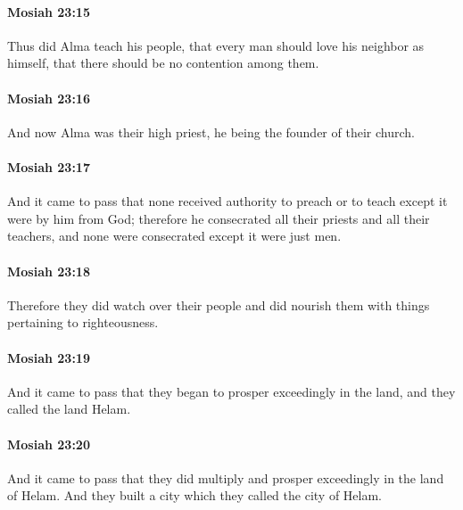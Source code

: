 		\paragraph{Mosiah 23:15} %
			\label{MOSIAH-23-15}

			Thus did Alma teach his people,
			that every man should love his neighbor as himself,
			that there should be no contention among them.

		\paragraph{Mosiah 23:16} %
			\label{MOSIAH-23-16}

			And now Alma was their high priest,
			he being the founder of their church.

		\paragraph{Mosiah 23:17} %
			\label{MOSIAH-23-17}

			And it came to pass that
			none received authority to preach or to teach
			except it were by him from God;
			therefore he consecrated all their priests and all their teachers,
			and none were consecrated except it were just men.

		\paragraph{Mosiah 23:18} %
			\label{MOSIAH-23-18}

			Therefore they did watch over their people
			and did nourish them with things pertaining to righteousness.

		\paragraph{Mosiah 23:19} %
			\label{MOSIAH-23-19}

			And it came to pass that
			they began to prosper exceedingly in the land,
			and they called the land Helam.

		\paragraph{Mosiah 23:20} %
			\label{MOSIAH-23-20}

			And it came to pass that
			they did multiply and prosper exceedingly in the land of Helam.
			And they built a city which they called the city of Helam.

